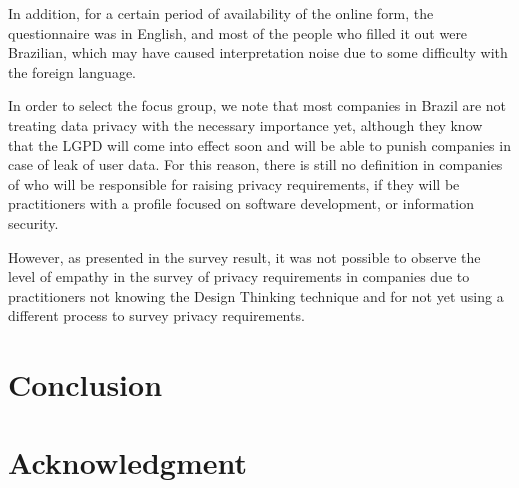 \documentclass[conference]{IEEEtran}
\begin{document}
In addition, for a certain period of availability of the online form, the questionnaire was in English, and most of the people who filled it out were Brazilian, which may have caused interpretation noise due to some difficulty with the foreign language.


In order to select the focus group, we note that most companies in Brazil are not treating data privacy with the necessary importance yet, although they know that the LGPD will come into effect soon and will be able to punish companies in case of leak of user data. For this reason, there is still no definition in companies of who will be responsible for raising privacy requirements, if they will be practitioners with a profile focused on software development, or information security.


However, as presented in the survey result, it was not possible to observe the level of empathy in the survey of privacy requirements in companies due to practitioners not knowing the Design Thinking technique and for not yet using a different process to survey privacy requirements.

\section{Conclusion}
\label{conclusion}

\section*{Acknowledgment}



\end{document}
